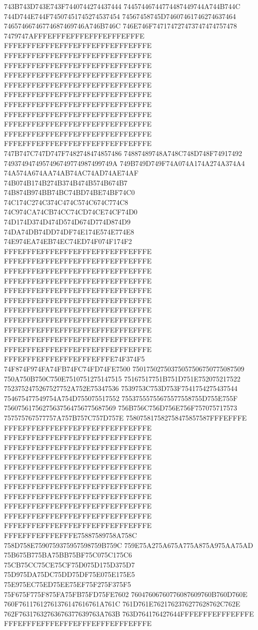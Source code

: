 743B743D743E743F7440744274437444
74457446744774487449744A744B744C
744D744E744F74507451745274537454
74567458745D74607461746274637464
74657466746774687469746A746B746C
746E746F747174727473747474757478
7479747AFFFEFFFEFFFEFFFEFFFEFFFE
FFFEFFFEFFFEFFFEFFFEFFFEFFFEFFFE
FFFEFFFEFFFEFFFEFFFEFFFEFFFEFFFE
FFFEFFFEFFFEFFFEFFFEFFFEFFFEFFFE
FFFEFFFEFFFEFFFEFFFEFFFEFFFEFFFE
FFFEFFFEFFFEFFFEFFFEFFFEFFFEFFFE
FFFEFFFEFFFEFFFEFFFEFFFEFFFEFFFE
FFFEFFFEFFFEFFFEFFFEFFFEFFFEFFFE
FFFEFFFEFFFEFFFEFFFEFFFEFFFEFFFE
FFFEFFFEFFFEFFFEFFFEFFFEFFFEFFFE
FFFEFFFEFFFEFFFEFFFEFFFEFFFEFFFE
FFFEFFFEFFFEFFFEFFFEFFFEFFFEFFFE
747B747C747D747F7482748474857486
74887489748A748C748D748F74917492
7493749474957496749774987499749A
749B749D749F74A074A174A274A374A4
74A574A674AA74AB74AC74AD74AE74AF
74B074B174B274B374B474B574B674B7
74B874B974BB74BC74BD74BE74BF74C0
74C174C274C374C474C574C674C774C8
74C974CA74CB74CC74CD74CE74CF74D0
74D174D374D474D574D674D774D874D9
74DA74DB74DD74DF74E174E574E774E8
74E974EA74EB74EC74ED74F074F174F2
FFFEFFFEFFFEFFFEFFFEFFFEFFFEFFFE
FFFEFFFEFFFEFFFEFFFEFFFEFFFEFFFE
FFFEFFFEFFFEFFFEFFFEFFFEFFFEFFFE
FFFEFFFEFFFEFFFEFFFEFFFEFFFEFFFE
FFFEFFFEFFFEFFFEFFFEFFFEFFFEFFFE
FFFEFFFEFFFEFFFEFFFEFFFEFFFEFFFE
FFFEFFFEFFFEFFFEFFFEFFFEFFFEFFFE
FFFEFFFEFFFEFFFEFFFEFFFEFFFEFFFE
FFFEFFFEFFFEFFFEFFFEFFFEFFFEFFFE
FFFEFFFEFFFEFFFEFFFEFFFEFFFEFFFE
FFFEFFFEFFFEFFFEFFFEFFFEFFFEFFFE
FFFEFFFEFFFEFFFEFFFEFFFE74F374F5
74F874F974FA74FB74FC74FD74FE7500
75017502750375057506750775087509
750A750B750C750E7510751275147515
75167517751B751D751E752075217522
7523752475267527752A752E75347536
7539753C753D753F7541754275437544
754675477549754A754D755075517552
75537555755675577558755D755E755F
75607561756275637564756775687569
756B756C756D756E756F757075717573
757575767577757A757B757C757D757E
758075817582758475857587FFFEFFFE
FFFEFFFEFFFEFFFEFFFEFFFEFFFEFFFE
FFFEFFFEFFFEFFFEFFFEFFFEFFFEFFFE
FFFEFFFEFFFEFFFEFFFEFFFEFFFEFFFE
FFFEFFFEFFFEFFFEFFFEFFFEFFFEFFFE
FFFEFFFEFFFEFFFEFFFEFFFEFFFEFFFE
FFFEFFFEFFFEFFFEFFFEFFFEFFFEFFFE
FFFEFFFEFFFEFFFEFFFEFFFEFFFEFFFE
FFFEFFFEFFFEFFFEFFFEFFFEFFFEFFFE
FFFEFFFEFFFEFFFEFFFEFFFEFFFEFFFE
FFFEFFFEFFFEFFFEFFFEFFFEFFFEFFFE
FFFEFFFEFFFEFFFEFFFEFFFEFFFEFFFE
FFFEFFFEFFFEFFFE75887589758A758C
758D758E7590759375957598759B759C
759E75A275A675A775A875A975AA75AD
75B675B775BA75BB75BF75C075C175C6
75CB75CC75CE75CF75D075D175D375D7
75D975DA75DC75DD75DF75E075E175E5
75E975EC75ED75EE75EF75F275F375F5
75F675F775F875FA75FB75FD75FE7602
76047606760776087609760B760D760E
760F76117612761376147616761A761C
761D761E7621762376277628762C762E
762F76317632763676377639763A763B
763D764176427644FFFEFFFEFFFEFFFE
FFFEFFFEFFFEFFFEFFFEFFFEFFFEFFFE
